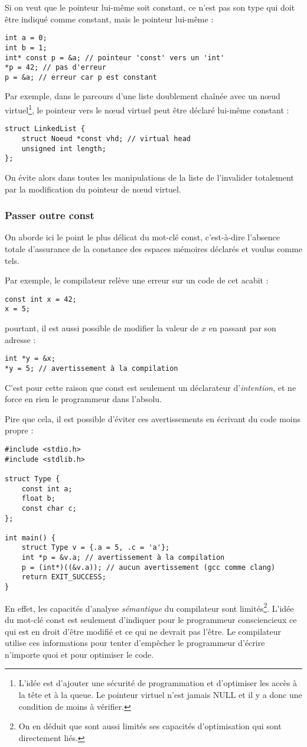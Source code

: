 \documentclass[../../../main.tex]{subfiles}
\begin{document}
Si on veut que le pointeur lui-même soit constant, ce n'est pas son type qui doit être indiqué comme constant, mais le pointeur lui-même :
\begin{verbatim}
int a = 0;
int b = 1;
int* const p = &a; // pointeur 'const' vers un 'int'
*p = 42; // pas d'erreur
p = &a; // erreur car p est constant
\end{verbatim}
Par exemple, dans le parcours d'une liste doublement chaînée avec un n\oe{}ud virtuel\footnote{L'idée est d'ajouter une sécurité de programmation et d'optimiser les accès à la tête et à la queue. Le pointeur virtuel n'est jamais \textsf{NULL} et il y a donc une condition de moins à vérifier.}, le pointeur vers le n\oe{}ud virtuel peut être déclaré lui-même constant :
\begin{verbatim}
struct LinkedList {
	struct Noeud *const vhd; // virtual head
	unsigned int length;	
};
\end{verbatim}
On évite alors dans toutes les manipulations de la liste de l'invalider totalement par la modification du pointeur de n\oe{}ud virtuel.
\subsubsection{Passer outre \textsf{const}}
\label{ssub:passer_outre_const}
On aborde ici le point le plus délicat du mot-clé \textsf{const}, c'est-à-dire l'absence totale d'assurance de la constance des espaces mémoires déclarés et voulus comme tels.

Par exemple, le compilateur relève une erreur sur un code de cet acabit :
\begin{verbatim}
const int x = 42;
x = 5;
\end{verbatim}
pourtant, il est aussi possible de modifier la valeur de $x$ en passant par son adresse :
\begin{verbatim}
int *y = &x;
*y = 5; // avertissement à la compilation
\end{verbatim}
C'est pour cette raison que \textsf{const} est seulement un déclarateur d'\textit{intention}, et ne force en rien le programmeur dans l'absolu.

Pire que cela, il est possible d'éviter ces avertissements en écrivant du code moins propre :
\begin{verbatim}
#include <stdio.h>
#include <stdlib.h>

struct Type {
	const int a;
	float b;
	const char c;	
};

int main() {
	struct Type v = {.a = 5, .c = 'a'};
	int *p = &v.a; // avertissement à la compilation
	p = (int*)((&v.a)); // aucun avertissement (gcc comme clang)
	return EXIT_SUCCESS;
}
\end{verbatim}
En effet, les capacités d'analyse \textit{sémantique} du compilateur sont limités\footnote{On en déduit que sont aussi limités ses capacités d'optimisation qui sont directement liés.}. L'idée du mot-clé \textsf{const} est seulement d'indiquer pour le programmeur consciencieux ce qui est en droit d'être modifié et ce qui ne devrait pas l'être. Le compilateur utilise ces informations pour tenter d'empêcher le programmeur d'écrire n'importe quoi et pour optimiser le code.
\end{document}
